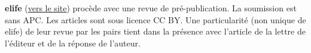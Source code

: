 {
%
%
%
%
%
%


%
%
%
%
}
\textbf{elife} (\href{https://elifesciences.org/about#process}{vers le site}) procède avec une revue de pré-publication.
La soumission est sans APC.
Les articles sont sous licence CC BY.
Une particularité (non unique de elife) de leur revue par les pairs tient dans la présence avec l'article de la lettre de l'éditeur et de la réponse de l'auteur.


